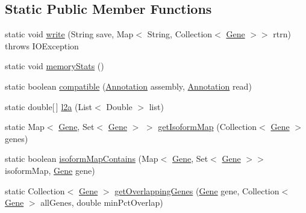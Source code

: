 \subsection*{Static Public Member Functions}
\begin{DoxyCompactItemize}
\item 
static void \hyperlink{classumms_1_1core_1_1scripture_1_1_build_scripture_coordinate_space_a424374a748085c5c60a2a8c8145e7852}{write} (String save, Map$<$ String, Collection$<$ \hyperlink{classumms_1_1core_1_1annotation_1_1_gene}{Gene} $>$$>$ rtrn)  throws I\+O\+Exception 
\item 
static void \hyperlink{classumms_1_1core_1_1scripture_1_1_build_scripture_coordinate_space_a132faf541275464d9bb333b6b7b6ad8b}{memory\+Stats} ()
\item 
static boolean \hyperlink{classumms_1_1core_1_1scripture_1_1_build_scripture_coordinate_space_acf4c8c23eafcf330eff979c95da4aa10}{compatible} (\hyperlink{interfaceumms_1_1core_1_1annotation_1_1_annotation}{Annotation} assembly, \hyperlink{interfaceumms_1_1core_1_1annotation_1_1_annotation}{Annotation} read)
\item 
static double\mbox{[}$\,$\mbox{]} \hyperlink{classumms_1_1core_1_1scripture_1_1_build_scripture_coordinate_space_a9eff08ae0cb49e5e80751701fb85b09d}{l2a} (List$<$ Double $>$ list)
\item 
static Map$<$ \hyperlink{classumms_1_1core_1_1annotation_1_1_gene}{Gene}, Set$<$ \hyperlink{classumms_1_1core_1_1annotation_1_1_gene}{Gene} $>$ $>$ \hyperlink{classumms_1_1core_1_1scripture_1_1_build_scripture_coordinate_space_a7ba371be0c1c6194e87333cdeb125467}{get\+Isoform\+Map} (Collection$<$ \hyperlink{classumms_1_1core_1_1annotation_1_1_gene}{Gene} $>$ genes)
\item 
static boolean \hyperlink{classumms_1_1core_1_1scripture_1_1_build_scripture_coordinate_space_affbce5fbd3aaa984b84581aeb4890039}{isoform\+Map\+Contains} (Map$<$ \hyperlink{classumms_1_1core_1_1annotation_1_1_gene}{Gene}, Set$<$ \hyperlink{classumms_1_1core_1_1annotation_1_1_gene}{Gene} $>$$>$ isoform\+Map, \hyperlink{classumms_1_1core_1_1annotation_1_1_gene}{Gene} gene)
\item 
static Collection$<$ \hyperlink{classumms_1_1core_1_1annotation_1_1_gene}{Gene} $>$ \hyperlink{classumms_1_1core_1_1scripture_1_1_build_scripture_coordinate_space_ad01703d5c482fa9d72c9be36be080627}{get\+Overlapping\+Genes} (\hyperlink{classumms_1_1core_1_1annotation_1_1_gene}{Gene} gene, Collection$<$ \hyperlink{classumms_1_1core_1_1annotation_1_1_gene}{Gene} $>$ all\+Genes, double min\+Pct\+Overlap)

\end{DoxyCompactItemize}
